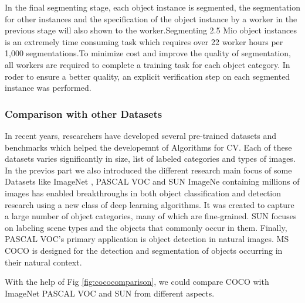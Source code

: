 \documentclass[
]{krantz}
\begin{document}
In the final segmenting stage, each object instance is segmented, the segmentation for other instances and the specification of the object instance by a worker in the previous stage will also shown to the worker.Segmenting 2.5 Mio object instances is an extremely time consuming task which requires over 22 worker hours per 1,000 segmentations.To minimize cost and improve the quality of segmentation, all workers are required to complete a training task for each object category.
In roder to ensure a better quality, an explicit verification step on each segmented instance was performed.

\hypertarget{comparison-with-other-datasets}{%
\subsubsection{Comparison with other Datasets}\label{comparison-with-other-datasets}}

In recent years, researchers have developed several pre-trained datasets and benchmarks which helped the developemnt of Algorithms for CV.
Each of these datasets varies significantly in size, list of labeled categories and types of images.
In the previos part we also introduced the different research main focus of some Datasets like ImageNet \citep{deng2009imagenet}, PASCAL VOC \citep{pascalvoc} and SUN \citep{sun}
ImageNe containing millions of images has enabled breakthroughs in both object classification and detection research using a new class of deep learning algorithms. It was created to capture a large number of object categories, many of which are fine-grained. SUN focuses on labeling scene types and the objects that commonly occur in them. Finally, PASCAL VOC's primary application is object detection in natural images. MS COCO is designed for the detection and segmentation of objects occurring in their natural context.\citep{mccoco}

With the help of Fig \ref{fig:cococomparison}, we could compare COCO with ImageNet PASCAL VOC and SUN from different aspects.\citep{mccoco}
\end{document}
